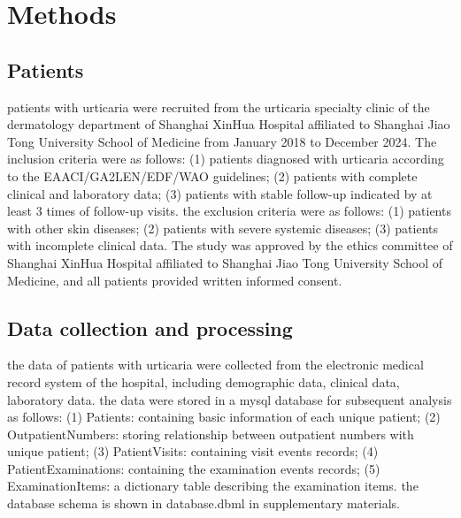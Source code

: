 \documentclass[preprint,12pt,authoryear]{elsarticle}
\begin{document}
\section{Methods}\label{Methods}
\subsection{Patients}\label{Patients}

patients with urticaria were recruited from the urticaria specialty clinic of the dermatology department of Shanghai XinHua Hospital affiliated to Shanghai Jiao Tong University School of Medicine from January 2018 to December 2024. The inclusion criteria were as follows: (1) patients diagnosed with urticaria according to the EAACI/GA2LEN/EDF/WAO guidelines\citep{Zuberbier2021The}; (2) patients with complete clinical and laboratory data; (3) patients with stable follow-up indicated by at least 3 times of follow-up visits. the exclusion criteria were as follows: (1) patients with other skin diseases; (2) patients with severe systemic diseases; (3) patients with incomplete clinical data. The study was approved by the ethics committee of Shanghai XinHua Hospital affiliated to Shanghai Jiao Tong University School of Medicine, and all patients provided written informed consent.

\subsection{Data collection and processing}\label{Data}

the data of patients with urticaria were collected from the electronic medical record system of the hospital, including demographic data, clinical data, laboratory data. the data were stored in a mysql database for subsequent analysis as follows: (1) Patients: containing basic information of each unique patient; (2) OutpatientNumbers: storing relationship between outpatient numbers with unique patient; (3) PatientVisits: containing visit events records; (4) PatientExaminations: containing the examination events records; (5) ExaminationItems: a dictionary table describing the examination items. the database schema is shown in database.dbml in supplementary materials.
\end{document}
